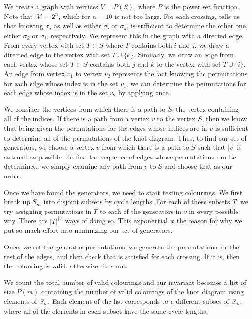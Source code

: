 \begin{paper}
We create a graph with vertices $V=P(S)$, where $P$ is the power set function.
Note that $|V|=2^n$, which for $n=10$ is not too large.
For each crossing, \eqRight tells us that knowing $\sigma_j$ as well as either
$\sigma_i$ or $\sigma_k$, is sufficient to determine the other one, either
$\sigma_k$ or $\sigma_i$, respectively.
We represent this in the graph with a directed edge.
From every vertex with set $T\subset S$ where $T$ contains both $i$ and $j$, we
draw a directed edge to the vertex with set $T\cup\{k\}$.
Similarly, we draw an edge from each vertex whose set $T\subset S$ contains both
$j$ and $k$ to the vertex with set $T\cup\{i\}$.
An edge from vertex $v_1$ to vertex $v_2$ represents the fact knowing the
permutations for each edge whose index is in the set $v_1$, we can determine the
permutations for each edge whose index is in the set $v_2$ by applying \eqRight
once.

We consider the vertices from which there is a path to $S$, the vertex
containing all of the indices.
If there is a path from a vertex $v$ to the vertex $S$, then we know that being
given the permutations for the edges whose indices are in $v$ is sufficient to
determine all of the permutations of the knot diagram.
Thus, to find our set of generators, we choose a vertex $v$ from which there is
a path to $S$ such that $|v|$ is as small as possible.
To find the sequence of edges whose permutations can be determined, we simply
examine any path from $v$ to $S$ and choose that as our order.


Once we have found the generators, we need to start testing colourings.
We first break up $S_m$ into disjoint subsets by cycle lengths.
For each of these subsets $T$, we try assigning permutations in $T$ to each of
the generators in $v$ in every possible way.
There are $|T|^{|v|}$ ways of doing so.
This exponential is the reason for why we put so much effort into minimizing our
set of generators.

Once, we set the generator permutations, we generate the permutations for the
rest of the edges, and then check that \eqRight is satisfied for each crossing.
If it is, then the colouring is valid, otherwise, it is not.


We count the total number of valid colourings and our invariant becomes a list
of size $P(m)$ containing the number of valid colourings of the knot diagram
using elements of $S_m$.
Each element of the list corresponds to a different subset of $S_m$, where all
of the elements in each subset have the same cycle lengths.


\end{paper}
